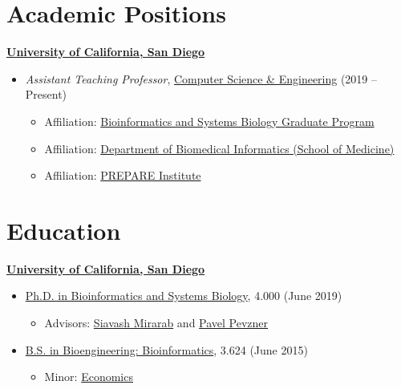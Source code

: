 \documentclass[margin,line]{res}
\begin{document}
\begin{resume}

\section{\sc Academic Positions}
{\bf \href{http://www.ucsd.edu/}{University of California, San Diego}}\\
\vspace*{-.1in}
\begin{itemize}
\item[] \hspace*{-2mm} \textit{Assistant Teaching Professor}, \href{http://www.cs.ucsd.edu/}{Computer Science \& Engineering} (2019 -- Present)
\begin{itemize}
\item Affiliation: \href{http://bioinformatics.ucsd.edu/}{Bioinformatics and Systems Biology Graduate Program}
\item Affiliation: \href{http://dbmi.ucsd.edu/}{Department of Biomedical Informatics (School of Medicine)}
\item Affiliation: \href{https://prepare.ucsd.edu/}{PREPARE Institute}
\end{itemize}
\end{itemize}

\section{\sc Education}
{\bf \href{http://www.ucsd.edu/}{University of California, San Diego}}\\
\vspace*{-.1in}
\begin{itemize}
\item[] \hspace*{-2mm}\href{http://bioinformatics.ucsd.edu/}{Ph.D. in Bioinformatics and Systems Biology}, 4.000 (June 2019)
\begin{itemize}
\item Advisors: \href{http://eceweb.ucsd.edu/~smirarab/}{Siavash Mirarab} and \href{http://cseweb.ucsd.edu/~ppevzner/}{Pavel Pevzner}
\end{itemize}
\vspace*{0in}
\item[] \hspace*{-2mm}\href{http://be.ucsd.edu/bioinformatics}{B.S. in Bioengineering: Bioinformatics}, 3.624 (June 2015)
\begin{itemize}
\item Minor: \href{https://economics.ucsd.edu/undergraduate-program/major-minor-requirements/minors.html}{Economics}
\end{itemize}
\end{itemize}


\end{resume}
\end{document}
